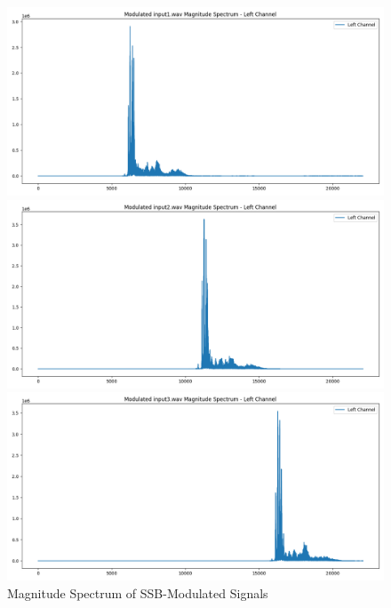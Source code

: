 \documentclass[12pt,a4paper]{article}
\begin{document}
\begin{figure}[H]
    \centering
    \begin{minipage}{0.29\textwidth}
        \centering
        \includegraphics[width=\textwidth]{../data/modulated/magnitude_spectrum/modulated_input1.wav_magnitude_spectrum.png}
    \end{minipage} \hfill
    \begin{minipage}{0.29\textwidth}
        \centering
        \includegraphics[width=\textwidth]{../data/modulated/magnitude_spectrum/modulated_input2.wav_magnitude_spectrum.png}
    \end{minipage} \hfill
    \begin{minipage}{0.29\textwidth}
        \centering
        \includegraphics[width=\textwidth]{../data/modulated/magnitude_spectrum/modulated_input3.wav_magnitude_spectrum.png}
    \end{minipage}
    \caption{Magnitude Spectrum of SSB-Modulated Signals}
\end{figure}
\end{document}
